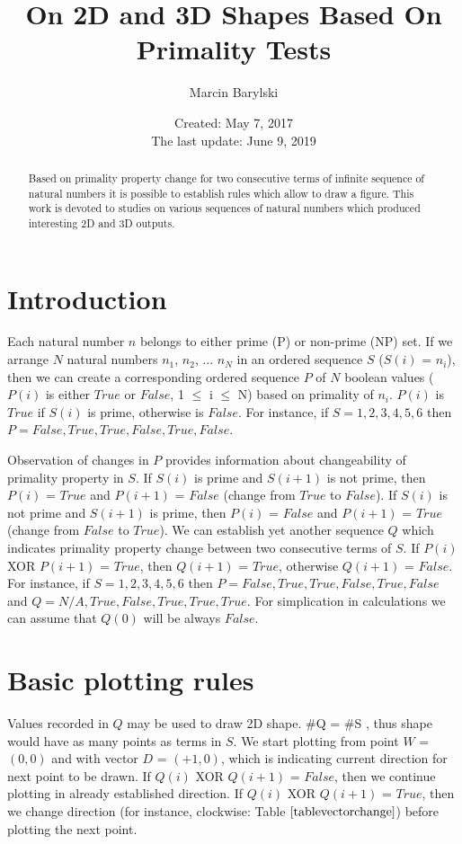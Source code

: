 \documentclass[10pt,twocolumn]{article}
\title{On 2D and 3D Shapes Based On Primality Tests}
\author{Marcin Barylski}
\date{\small{Created: May 7, 2017 \\ The last update: June 9, 2019}}
\begin{document}
\maketitle

\begin{abstract}
Based on primality property change for two consecutive terms of infinite sequence of natural numbers it is possible to establish rules which allow to draw a figure. This work is devoted to studies on various sequences of natural numbers which produced interesting 2D and 3D outputs.
\end{abstract}


\section{Introduction}

Each natural number $n$ belongs to either prime (P) or non-prime (NP) set. If we arrange $N$ natural numbers $n_1$, $n_2$, ... $n_N$ in an ordered sequence $S$ ($S(i)$ = $n_i$), then we can create a corresponding ordered sequence $P$ of $N$ boolean values ($P(i)$ is either $True$ or $False$, 1 $\leq$ i $\leq$ N) based on primality of $n_i$. $P(i)$ is $True$ if $S(i)$ is prime, otherwise is $False$. For instance, if $S = 1, 2, 3, 4, 5, 6$ then $P = False, True, True, False, True, False$. \par
Observation of changes in $P$ provides information about changeability of primality property in $S$. If $S(i)$ is prime and $S(i+1)$ is not prime, then $P(i)$ = $True$ and $P(i+1)$ = $False$ (change from $True$ to $False$).  If $S(i)$ is not prime and $S(i+1)$ is prime, then $P(i)$ = $False$ and $P(i+1)$ = $True$ (change from $False$ to $True$). We can establish yet another sequence $Q$ which indicates primality property change between two consecutive terms of $S$. If $P(i)$ XOR $P(i+1)$ = $True$, then $Q(i+1)$ = $True$, otherwise $Q(i+1)$ = $False$. For instance, if $S = 1, 2, 3, 4, 5, 6$ then $P = False, True, True, False, True, False$ and $Q = N/A, True, False, True, True, True$. For simplication in calculations we can assume that $Q(0)$ will be always $False$.\par

\section{Basic plotting rules}

Values recorded in $Q$ may be used to draw 2D shape. \#Q = \#S , thus shape would have as many points as terms in $S$. We start plotting from point $W$ = $(0, 0)$ and with vector $D$ = $(+1,0)$, which is indicating current direction for next point to be drawn.
If $Q(i)$ XOR $Q(i+1)$ = $False$, then we continue plotting in already established direction. If $Q(i)$ XOR $Q(i+1)$ = $True$, then we change direction (for instance, clockwise: Table $\ref{tablevectorchange}$) before plotting the next point.
\end{document}
